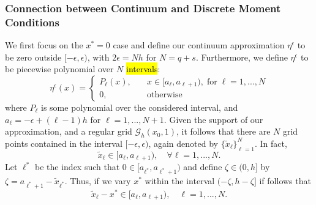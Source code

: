 %



\subsubsection{Connection between Continuum and Discrete Moment Conditions}

We first focus on the $x^*=0$ case and define our continuum approximation $\eta^\epsilon$ to be zero outside $[-\epsilon,\epsilon)$, with $2\epsilon=Nh$ for $N=q+s$. 
Furthermore, we define $\eta^\epsilon$ to be piecewise polynomial over $N$ \hl{intervals}: 
 \begin{equation}\label{eq:eta}
 	\eta^\epsilon(x) = \left\{ \begin{array}{rl}
		P_\ell(x),& \quad x\in[a_\ell,a_{\ell+1}), \; \text{for}\; \ell=1,...,N\\
		0,& \quad \text{otherwise}
	\end{array}\right.
 \end{equation}
where $P_\ell$ is some polynomial over the considered interval, and $a_{\ell}=-\epsilon+ (\ell-1)h$ for $\ell=1,...,N+1$.
Given the support of our approximation, and a regular grid $\mathcal G_h(x_0,1)$, it follows that there are $N$ grid points contained in the interval $[-\epsilon,\epsilon)$, again denoted by $\{\tilde x_\ell\}_{\ell=1}^N$.
In fact,
\[
	\tilde x_\ell \in [a_\ell,a_{\ell+1}), \quad \forall \ell=1,...,N.
\]
Let $\ell^*$ be the index such that $0\in[a_{\ell^*},a_{\ell^*+1})$ and define $\zeta\in(0,h]$ by $\zeta=a_{\ell^*+1}-\tilde x_{\ell^*}$.
Thus, if we vary $x^*$ within the interval $(-\zeta,h-\zeta]$ if follows that
\[
	\tilde x_\ell - x^* \in [a_\ell,a_{\ell+1}), \quad \ell=1,...,N.
\]


